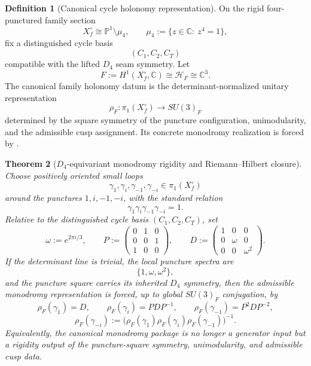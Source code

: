 \documentclass[11pt,a4paper]{article}
\newtheorem{theorem}{Theorem}[section]
\theoremstyle{definition}
\newtheorem{definition}[theorem]{Definition}
\theoremstyle{remark}
\begin{document}
\begin{definition}[Canonical cycle holonomy representation]
\label{def:canonical-cycle-holonomy}
On the rigid four-punctured family section
\[
X_f^\circ\cong \mathbb P^1\setminus\mu_4,
\qquad
\mu_4:=\{z\in\mathbb C:\ z^4=1\},
\]
fix a distinguished cycle basis
\[
(C_1,C_2,C_T)
\]
compatible with the lifted $D_4$ seam symmetry. Let
\[
F:=H^1(X_f^\circ,\mathbb C)\cong\mathcal H_F\cong\mathbb C^3.
\]
The canonical family holonomy datum is the determinant-normalized unitary representation
\[
\rho_F:\pi_1(X_f^\circ)\to SU(3)_F
\]
determined by the square symmetry of the puncture configuration, unimodularity, and the
admissible cusp assignment. Its concrete monodromy realization is forced by
.
\end{definition}

\begin{theorem}[$D_4$-equivariant monodromy rigidity and Riemann--Hilbert closure]
\label{thm:d4-monodromy-rigidity}
\label{prop:generator-family-holonomy}
\label{thm:d4-riemann-hilbert-rigidity}
Choose positively oriented small loops
\[
\gamma_1,\gamma_i,\gamma_{-1},\gamma_{-i}\in\pi_1(X_f^\circ)
\]
around the punctures $1,i,-1,-i$, with the standard relation
\[
\gamma_1\gamma_i\gamma_{-1}\gamma_{-i}=1.
\]
Relative to the distinguished cycle basis $(C_1,C_2,C_T)$, set
\[
\omega:=e^{2\pi i/3},
\qquad
P:=
\begin{pmatrix}
0&1&0\\
0&0&1\\
1&0&0
\end{pmatrix},
\qquad
D:=
\begin{pmatrix}
1&0&0\\
0&\omega&0\\
0&0&\omega^2
\end{pmatrix}.
\]
If the determinant line is trivial, the local puncture spectra are
\[
\{1,\omega,\omega^2\},
\]
and the puncture square carries its inherited $D_4$ symmetry, then the admissible monodromy
representation is forced, up to global $SU(3)_F$ conjugation, by
\[
\rho_F(\gamma_1)=D,
\qquad
\rho_F(\gamma_i)=PDP^{-1},
\qquad
\rho_F(\gamma_{-1})=P^2DP^{-2},
\]
\[
\rho_F(\gamma_{-i})
:=
\bigl(\rho_F(\gamma_1)\rho_F(\gamma_i)\rho_F(\gamma_{-1})\bigr)^{-1}.
\]
Equivalently, the canonical monodromy package is no longer a generator input but a rigidity output
of the puncture-square symmetry, unimodularity, and admissible cusp data.
\end{theorem}
\end{document}
